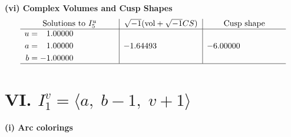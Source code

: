 \documentclass[1p]{elsarticle_modified}
\theoremstyle{definition}
\newcommand{\I}{\sqrt{-1}}
\begin{document}
\newpage\flushleft \textbf{(vi) Complex Volumes and Cusp Shapes}
$$\begin{array}{c|c|c}  
\text{Solutions to }I^u_{5}& \I (\text{vol} + \sqrt{-1}CS) & \text{Cusp shape}\\
 \hline 
\begin{aligned}
u &= \phantom{-}1.00000\phantom{ +0.000000I} \\
a &= \phantom{-}1.00000\phantom{ +0.000000I} \\
b &= -1.00000\phantom{ +0.000000I}\end{aligned}
 & -1.64493\phantom{ +0.000000I} & -6.00000\phantom{ +0.000000I}\\
 \hline 
 \end{array}$$\newpage\newpage\renewcommand{\arraystretch}{1}
\centering \section*{VI. $I^v_{1}= \langle a,\;b-1,\;v+1 \rangle$}
\flushleft \textbf{(i) Arc colorings}\\
\end{document}
